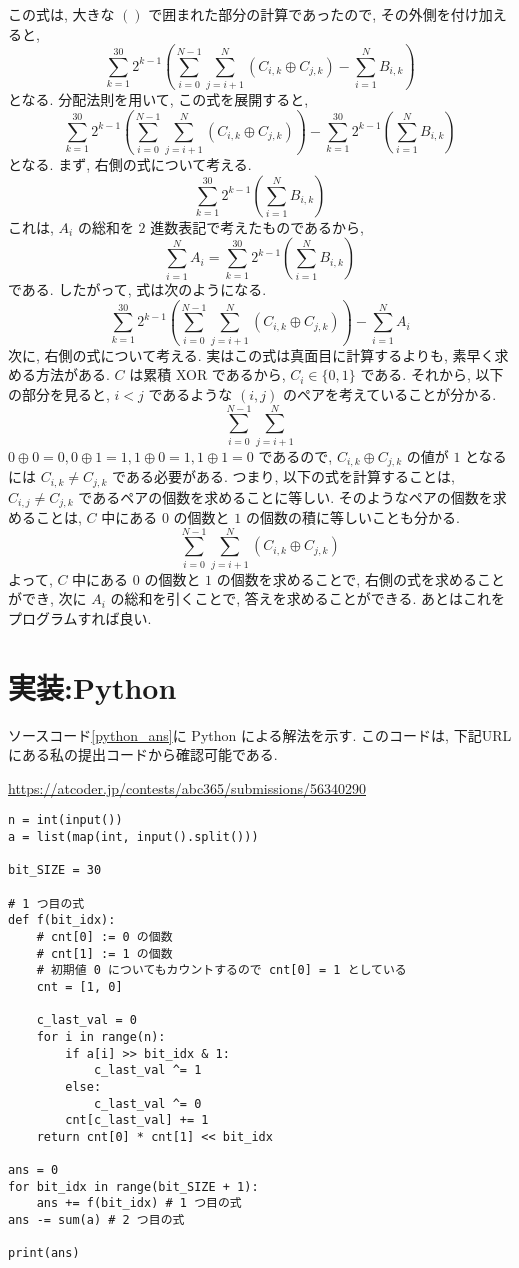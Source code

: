     この式は, 大きな $\left(\right)$ で囲まれた部分の計算であったので, その外側を付け加えると,
    $$\sum_{k = 1}^{30} 2^{k - 1} \left(\sum_{i = 0}^{N - 1}\sum_{j = i + 1}^N (C_{i, k} \oplus C_{j, k}) - \sum_{i = 1}^{N} B_{i, k}\right)$$
    となる.
    分配法則を用いて, この式を展開すると,
    $$\sum_{k = 1}^{30} 2^{k - 1} \left(\sum_{i = 0}^{N - 1}\sum_{j = i + 1}^N (C_{i, k} \oplus C_{j, k})\right) - \sum_{k = 1}^{30} 2^{k - 1} \left(\sum_{i = 1}^{N} B_{i, k}\right)$$
    となる.
    まず, 右側の式について考える.
    $$\sum_{k = 1}^{30} 2^{k - 1} \left(\sum_{i = 1}^{N} B_{i, k}\right)$$
    これは, $A_i$ の総和を $2$ 進数表記で考えたものであるから, 
    $$\sum_{i = 1}^{N} A_i = \sum_{k = 1}^{30} 2^{k - 1} \left(\sum_{i = 1}^{N} B_{i, k}\right)$$
    である.
    したがって, 式は次のようになる.
    $$\sum_{k = 1}^{30} 2^{k - 1} \left(\sum_{i = 0}^{N - 1}\sum_{j = i + 1}^N (C_{i, k} \oplus C_{j, k})\right) - \sum_{i = 1}^{N} A_i$$
    次に, 右側の式について考える.
    実はこの式は真面目に計算するよりも, 素早く求める方法がある.
    $C$ は累積 XOR であるから, $C_i \in \{0, 1\}$ である.
    それから, 以下の部分を見ると, $i < j$ であるような $(i, j)$ のペアを考えていることが分かる.
    $$\sum_{i = 0}^{N - 1}\sum_{j = i + 1}^N$$
    $0 \oplus 0 = 0, 0 \oplus 1 = 1, 1 \oplus 0 = 1, 1 \oplus 1 = 0$ であるので, $C_{i, k} \oplus C_{j, k}$ の値が $1$ となるには $C_{i, k} \neq C_{j, k}$ である必要がある.
    つまり, 以下の式を計算することは, $C_{i, j} \neq C_{j, k}$ であるペアの個数を求めることに等しい.
    そのようなペアの個数を求めることは, $C$ 中にある $0$ の個数と $1$ の個数の積に等しいことも分かる.
    $$\sum_{i = 0}^{N - 1}\sum_{j = i + 1}^N (C_{i, k} \oplus C_{j, k})$$
    よって, $C$ 中にある $0$ の個数と $1$ の個数を求めることで, 右側の式を求めることができ, 次に $A_i$ の総和を引くことで, 答えを求めることができる.
    あとはこれをプログラムすれば良い.

    \section*{実装:Python}
    ソースコード\ref{python_ans}に Python による解法を示す.
    このコードは, 下記URLにある私の提出コードから確認可能である.

    \url{https://atcoder.jp/contests/abc365/submissions/56340290}
\begin{lstlisting}[caption=Pythonのコード, label=python_ans]
n = int(input())
a = list(map(int, input().split()))

bit_SIZE = 30

# 1 つ目の式
def f(bit_idx):
    # cnt[0] := 0 の個数
    # cnt[1] := 1 の個数
    # 初期値 0 についてもカウントするので cnt[0] = 1 としている
    cnt = [1, 0]

    c_last_val = 0
    for i in range(n):
        if a[i] >> bit_idx & 1:
            c_last_val ^= 1
        else:
            c_last_val ^= 0
        cnt[c_last_val] += 1
    return cnt[0] * cnt[1] << bit_idx

ans = 0
for bit_idx in range(bit_SIZE + 1):
    ans += f(bit_idx) # 1 つ目の式
ans -= sum(a) # 2 つ目の式

print(ans)
\end{lstlisting}

